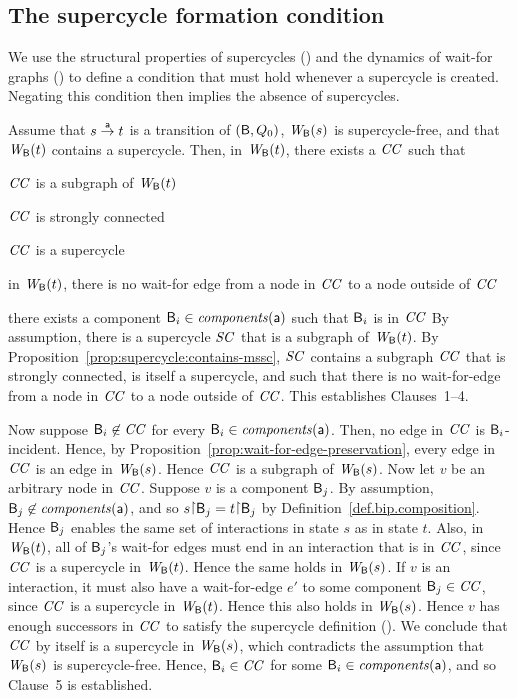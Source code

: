 \subsection{The supercycle formation condition}

We use the structural properties of supercycles () and the 
dynamics of wait-for graphs () to define a condition that 
must hold whenever a supercycle is created. Negating this condition then implies the absence of
supercycles. 


 \label{prop:supercycle-formation}
Assume that $s \goesto[\act] t$ is a transition of $(\B, Q_0)$, $\wfg{\B}{s}$ is supercycle-free, and that $\wfg{\B}{t}$
contains a supercycle.  Then, in $\wfg{\B}{t}$, there exists a $\CC$ such that
\bn
\item $\CC$ is a subgraph of $\wfg{\B}{t}$
\item $\CC$ is strongly connected
\item $\CC$ is a supercycle
\item  in $\wfg{\B}{t}$, there is no wait-for edge from a node in $\CC$ to a node outside of $\CC$
\item there exists a component $\B_i \in \cmps{\act}$ such that $\B_i$ is in $\CC$
\en
\ep
%
\bpr
By assumption, there is a supercycle $\SC$ that is a subgraph of $\wfg{\B}{t}$.
By Proposition~\ref{prop:supercycle:contains-mssc}, $\SC$ contains a
subgraph $\CC$ that is strongly connected, is itself a supercycle, and
such that there is no wait-for-edge from a node in $\CC$ to a node outside of $\CC$.
This establishes Clauses~1--4.

Now suppose $\B_i \not\in \CC$ for every $\B_i \in \cmps{\act}$. Then, no edge in $\CC$ is
$\B_i$-incident.  Hence, by Proposition~\ref{prop:wait-for-edge-preservation}, every edge in $\CC$
is an edge in $\wfg{\B}{s}$. Hence $\CC$ is a subgraph of $\wfg{\B}{s}$.
%
Now let $v$ be an arbitrary node in $\CC$.
%
Suppose $v$ is a component $\B_j$.  By assumption, $\B_j \not\in \cmps{\act}$, and so
$s \pj \B_j = t \pj \B_j$ by Definition~\ref{def.bip.composition}. Hence $\B_j$ enables the same set
of interactions in state $s$ as in state $t$. Also, in $\wfg{\B}{t}$, all of $\B_j$'s wait-for edges
must end in an interaction that is in $\CC$, since $\CC$ is a supercycle in $\wfg{\B}{t}$. Hence the
same holds in $\wfg{\B}{s}$.
%
If $v$ is an interaction, it must also have a wait-for-edge $e'$ to some component $\B_j \in \CC$,
since $\CC$ is a supercycle in $\wfg{\B}{t}$. Hence this also holds in $\wfg{\B}{s}$.
%
Hence $v$ has enough successors in $\CC$ to satisfy the supercycle definition ().
%
We conclude that $\CC$ by itself is a supercycle in $\wfg{\B}{s}$, which contradicts the assumption
that $\wfg{\B}{s}$ is supercycle-free. Hence, $\B_i \in \CC$ for some $\B_i \in \cmps{\act}$, and so
Clause~5 is established.  
\epr



